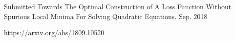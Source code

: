 \begin{cventries}
  \cventry
    {Submitted}
    {Towards The Optimal Construction of A Loss Function Without Spurious Local Minima For Solving Quadratic Equations.}
    {}
    {Sep. 2018}
    {
      \begin{cvitems}
        \item {https://arxiv.org/abs/1809.10520}
      \end{cvitems}
    }
\end{cventries}
